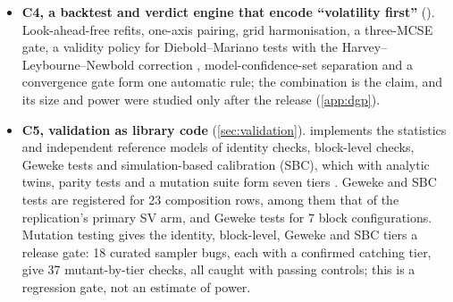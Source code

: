 \begin{itemize}
\item \textbf{C4, a backtest and verdict engine that encode ``volatility first''} ().
  Look-ahead-free refits, one-axis pairing, grid harmonisation, a three-MCSE gate, a validity policy for Diebold--Mariano tests with the Harvey--Leybourne--Newbold correction \citep{harvey1997testing}, model-confidence-set separation and a convergence gate \citep{vehtari2021rank} form one automatic rule; the combination is the claim, and its size and power were studied only after the release (\cref{app:dgp}). %
\item \textbf{C5, validation as library code} (\cref{sec:validation}).
   implements the statistics and independent reference models of identity checks, block-level checks, Geweke tests and simulation-based calibration (SBC), which with analytic twins, parity tests and a mutation suite form seven tiers \citep{geweke2004getting,cook2006validation,gelman2017correction,talts2018validating,modrak2025simulation,grosse2014testing,gandy2021unit,sailynoja2022graphical}. %
  Geweke and SBC tests are registered for 23 composition rows, among them that of the replication's primary SV arm, and Geweke tests for 7 block configurations. %
  Mutation testing \citep{demillo1978hints,jia2011analysis} gives the identity, block-level, Geweke and SBC tiers a release gate: 18 curated sampler bugs, each with a confirmed catching tier, give 37 mutant-by-tier checks, all caught with passing controls; this is a regression gate, not an estimate of power. %

\end{itemize}
